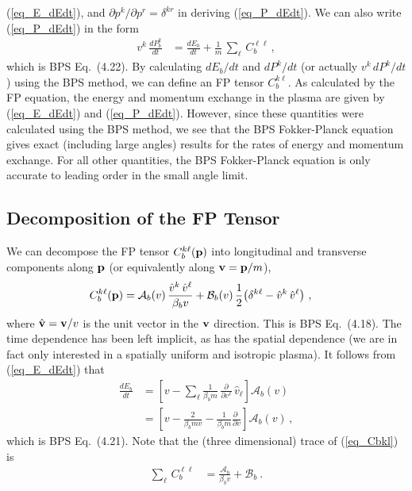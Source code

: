 \documentclass[preprint,12pt,eqsecnum,nofootinbib,amsmath,amssymb]{revtex4}
\begin{document}
(\ref{eq_E_dEdt}), and  $\partial p^k/\partial p^r =\delta^{k r}$ in 
deriving (\ref{eq_P_dEdt}). We can also write (\ref{eq_P_dEdt}) in 
the form
\begin{align}
  v^k \, \frac{dP_b^k}{dt} 
  &= 
  \frac{dE_b}{dt} 
  +
  \frac{1}{m} \, {\sum}_\ell \, C_b^{\ell \ell} \,,
\end{align}
which is BPS Eq.~(4.22). 
By calculating
$dE_b/dt$ and $dP^k/dt$ (or actually $v^k \, dP^k/dt$)
using the BPS method, we can define an FP tensor 
$C_b^{k \ell}$. As calculated by the FP equation, the 
energy and momentum 
exchange in the plasma are given by (\ref{eq_E_dEdt}) and 
(\ref{eq_P_dEdt}). However, since these quantities were calculated
using the BPS method, we see that the BPS Fokker-Planck 
equation gives exact (including large angles) results for the 
rates of energy and momentum exchange. For all other quantities,
the BPS Fokker-Planck equation is only accurate to leading 
order in the small angle limit. 


\subsection{Decomposition of the FP Tensor}

We can decompose the FP tensor $C_b^{k\ell}({\bf p})$ into 
longitudinal and transverse components along ${\bf p}$ (or
equivalently along ${\bf v}={\bf p}/m$), 
\begin{align}
  C_b^{k \ell}({\bf p})
  &= 
  {\mathcal A}_b(v) \, \frac{\hat v^k \, \hat v^\ell}{\beta_b v}
   + 
 { \mathcal B}_b(v)  \,\frac{1}{2} \big(\delta^{k \ell } - \hat v^k\,  \hat v^\ell \big)
  \ ,
  \label{eq_Cbkl}
\end{align}
where $\hat{\bf v} = {\bf v}/v$ is the unit vector in the ${\bf v}$ direction. 
This  is BPS Eq.~(4.18). The time dependence has been left implicit, as has 
the spatial dependence (we are in fact only interested in a spatially uniform 
and isotropic plasma). It follows from  (\ref{eq_E_dEdt}) that
\begin{align}
  \frac{dE_b}{dt}
  &= 
  \left[ v - {\sum}_\ell
  \frac{1}{\beta_b m}\, \frac{\partial}{\partial v^\ell}\, \hat v_\ell
  \right]
  {\mathcal A}_b(v)
  \\[8pt]
  &=
  \left[ v -  \frac{2}{\beta_b m v} -\frac{1}{\beta_b m} 
  \frac{\partial \,\,}{\partial v} 
  \right] {\mathcal A}_b(v) 
  \,,
\end{align}
which is BPS Eq.~(4.21). Note that the (three dimensional) trace of
(\ref{eq_Cbkl}) is
\begin{align}
  {\sum}_\ell \, C_b^{\ell \ell}
  &= 
  \frac{ {\mathcal A}_b}{\beta_b v}
   + 
 { \mathcal B}_b  
  \ .
  \label{eq_C_trace_AB}
\end{align}
\end{document}
